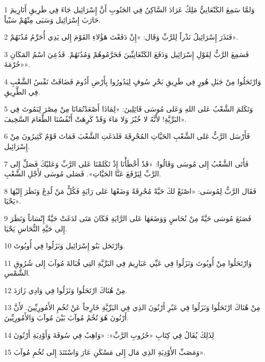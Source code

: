 \par 1 وَلمَّا سَمِعَ الكَنْعَانِيُّ مَلِكُ عَرَادَ السَّاكِنُ فِي الجَنُوبِ أَنَّ إِسْرَائِيل جَاءَ فِي طَرِيقِ أَتَارِيمَ حَارَبَ إِسْرَائِيل وَسَبَى مِنْهُمْ سَبْياً.
\par 2 فَنَذَرَ إِسْرَائِيلُ نَذْراً لِلرَّبِّ وَقَال: «إِنْ دَفَعْتَ هَؤُلاءِ القَوْمَ إِلى يَدِي أُحَرِّمُ مُدُنَهُمْ».
\par 3 فَسَمِعَ الرَّبُّ لِقَوْلِ إِسْرَائِيل وَدَفَعَ الكَنْعَانِيِّينَ فَحَرَّمُوهُمْ وَمُدُنَهُمْ. فَدُعِيَ اسْمُ المَكَانِ «حُرْمَةَ».
\par 4 وَارْتَحَلُوا مِنْ جَبَلِ هُورٍ فِي طَرِيقِ بَحْرِ سُوفٍ لِيَدُورُوا بِأَرْضِ أَدُومَ فَضَاقَتْ نَفْسُ الشَّعْبِ فِي الطَّرِيقِ.
\par 5 وَتَكَلمَ الشَّعْبُ عَلى اللهِ وَعَلى مُوسَى قَائِلِينَ: «لِمَاذَا أَصْعَدْتُمَانَا مِنْ مِصْرَ لِنَمُوتَ فِي البَرِّيَّةِ! لأَنَّهُ لا خُبْزَ وَلا مَاءَ وَقَدْ كَرِهَتْ أَنْفُسُنَا الطَّعَامَ السَّخِيفَ».
\par 6 فَأَرْسَل الرَّبُّ عَلى الشَّعْبِ الحَيَّاتِ المُحْرِقَةَ فَلدَغَتِ الشَّعْبَ فَمَاتَ قَوْمٌ كَثِيرُونَ مِنْ إِسْرَائِيل.
\par 7 فَأَتَى الشَّعْبُ إِلى مُوسَى وَقَالُوا: «قَدْ أَخْطَأْنَا إِذْ تَكَلمْنَا عَلى الرَّبِّ وَعَليْكَ فَصَلِّ إِلى الرَّبِّ لِيَرْفَعَ عَنَّا الحَيَّاتِ». فَصَلى مُوسَى لأَجْلِ الشَّعْبِ.
\par 8 فَقَال الرَّبُّ لِمُوسَى: «اصْنَعْ لكَ حَيَّةً مُحْرِقَةً وَضَعْهَا عَلى رَايَةٍ فَكُلُّ مَنْ لُدِغَ وَنَظَرَ إِليْهَا يَحْيَا».
\par 9 فَصَنَعَ مُوسَى حَيَّةً مِنْ نُحَاسٍ وَوَضَعَهَا عَلى الرَّايَةِ فَكَانَ مَتَى لدَغَتْ حَيَّةٌ إِنْسَاناً وَنَظَرَ إِلى حَيَّةِ النُّحَاسِ يَحْيَا.
\par 10 وَارْتَحَل بَنُو إِسْرَائِيل وَنَزَلُوا فِي أُوبُوتَ.
\par 11 وَارْتَحَلُوا مِنْ أُوبُوتَ وَنَزَلُوا فِي عَيِّي عَبَارِيمَ فِي البَرِّيَّةِ التِي قُبَالةَ مُوآبَ إِلى شُرُوقِ الشَّمْسِ.
\par 12 مِنْ هُنَاكَ ارْتَحَلُوا وَنَزَلُوا فِي وَادِي زَارَدَ.
\par 13 مِنْ هُنَاكَ ارْتَحَلُوا وَنَزَلُوا فِي عَبْرِ أَرْنُونَ الذِي فِي البَرِّيَّةِ خَارِجاً عَنْ تُخُمِ الأَمُورِيِّينَ. لأَنَّ أَرْنُونَ هُوَ تُخُمُ مُوآبَ بَيْنَ مُوآبَ وَالأَمُورِيِّينَ.
\par 14 لِذَلِكَ يُقَالُ فِي كِتَابِ «حُرُوبِ الرَّبِّ»: «وَاهِبٌ فِي سُوفَةَ وَأَوْدِيَةِ أَرْنُونَ
\par 15 وَمَصَبِّ الأَوْدِيَةِ الذِي مَال إِلى مَسْكَنِ عَارَ وَاسْتَنَدَ إِلى تُخُمِ مُوآبَ».
